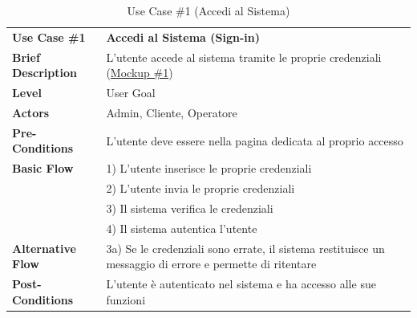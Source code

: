 \documentclass{article}
\begin{document}
\renewcommand{\arraystretch}{1.5}

\begin{table}[p]
    \begin{tabularx}{\textwidth}{ | l  X | }
        \rowcolor{lightgray!70}
        \hline
        \textbf{Use Case \#1} & \textbf{Accedi al Sistema (Sign-in)}\\[0.5ex]
        \textbf{Brief Description} & L'utente accede al sistema tramite le proprie credenziali (\hyperref[fig:mockup_1]{Mockup \#1})\\
        \rowcolor{blue!10}
        \textbf{Level} & User Goal \\
        \textbf{Actors} & Admin, Cliente, Operatore \\
        \rowcolor{blue!10}
        \textbf{Pre-Conditions} & L'utente deve essere nella pagina dedicata al proprio accesso \\
        \textbf{Basic Flow} & 1) L'utente inserisce le proprie credenziali\\
        & 2) L'utente invia le proprie credenziali\\
        & 3) Il sistema verifica le credenziali\\
        & 4) Il sistema autentica l'utente \\        
        \rowcolor{blue!10}
        \textbf{Alternative Flow} & 3a) Se le credenziali sono errate, il sistema restituisce un messaggio di errore e permette di ritentare \\
        \textbf{Post-Conditions} & L'utente è autenticato nel sistema e ha accesso alle sue funzioni \\
        \hline
    \end{tabularx}
    \caption{Use Case \#1 (Accedi al Sistema)}
\end{table}
\end{document}
